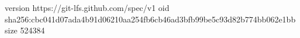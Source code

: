 version https://git-lfs.github.com/spec/v1
oid sha256:cbc041d07ada4b91d06210aa254fb6cb46ad3bfb99be5c93d82b774bb062e1bb
size 524384
